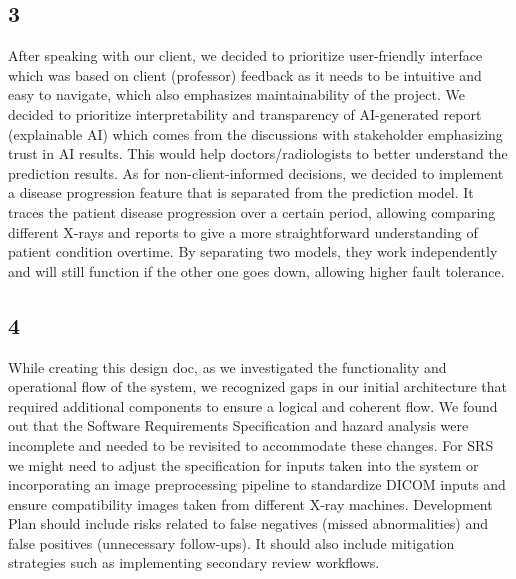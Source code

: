 \documentclass[12pt, titlepage]{article}
\begin{document}
\subsection{3}
After speaking with our client, we decided to prioritize user-friendly interface which was based on client (professor) feedback as it needs to be intuitive and easy to navigate, which also emphasizes maintainability of the project. We decided to prioritize interpretability and transparency of AI-generated report (explainable AI) which comes from the discussions with stakeholder emphasizing trust in AI results. This would help doctors/radiologists to better understand the prediction results. As for non-client-informed decisions, we decided to implement a disease progression feature that is separated from the prediction model. It traces the patient disease progression over a certain period, allowing comparing different X-rays and reports to give a more straightforward understanding of patient condition overtime. By separating two models, they work independently and will still function if the other one goes down, allowing higher fault tolerance.

\subsection{4}
While creating this design doc, as we investigated the functionality and operational flow of the system, we recognized gaps in our initial architecture that required additional components to ensure a logical and coherent flow. We found out that the Software Requirements Specification and hazard analysis were incomplete and needed to be revisited to accommodate these changes. For SRS we might need to adjust the specification for inputs taken into the system or incorporating an image preprocessing pipeline to standardize DICOM inputs and ensure compatibility images taken from different X-ray machines. Development Plan should include risks related to false negatives (missed abnormalities) and false positives (unnecessary follow-ups). It should also include mitigation strategies such as implementing secondary review workflows. 
\end{document}
